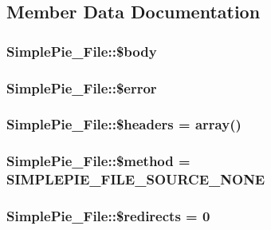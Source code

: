 \subsection{Member Data Documentation}
\hypertarget{class_simple_pie___file_a2821f719c5d29f8fe8c64b81fe7d5823}{
\subsubsection[{\$body}]{\setlength{\rightskip}{0pt plus 5cm}Simple\-Pie\-\_\-\-File\-::\$body}}\label{class_simple_pie___file_a2821f719c5d29f8fe8c64b81fe7d5823}
\hypertarget{class_simple_pie___file_ae1bd37c54bc14e3bafc6ae94739e204c}{
\subsubsection[{\$error}]{\setlength{\rightskip}{0pt plus 5cm}Simple\-Pie\-\_\-\-File\-::\$error}}\label{class_simple_pie___file_ae1bd37c54bc14e3bafc6ae94739e204c}
\hypertarget{class_simple_pie___file_ae8482dff7d8265e5e253bdf1af583416}{
\subsubsection[{\$headers}]{\setlength{\rightskip}{0pt plus 5cm}Simple\-Pie\-\_\-\-File\-::\$headers = array()}}\label{class_simple_pie___file_ae8482dff7d8265e5e253bdf1af583416}
\hypertarget{class_simple_pie___file_a9190c10db62f456aeb5304a4f47b40ab}{
\subsubsection[{\$method}]{\setlength{\rightskip}{0pt plus 5cm}Simple\-Pie\-\_\-\-File\-::\$method = {\bf S\-I\-M\-P\-L\-E\-P\-I\-E\-\_\-\-F\-I\-L\-E\-\_\-\-S\-O\-U\-R\-C\-E\-\_\-\-N\-O\-N\-E}}}\label{class_simple_pie___file_a9190c10db62f456aeb5304a4f47b40ab}
\hypertarget{class_simple_pie___file_adf94fc2991896766e43705995cbcf5f3}{
\subsubsection[{\$redirects}]{\setlength{\rightskip}{0pt plus 5cm}Simple\-Pie\-\_\-\-File\-::\$redirects = 0}}\label{class_simple_pie___file_adf94fc2991896766e43705995cbcf5f3}
